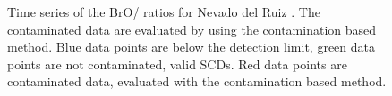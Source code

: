 \documentclass  [
  paper    = a4,
  BCOR     = 10mm,
  twoside,
  fontsize = 12pt,
  fleqn,
  toc      = bibnumbered,
  toc      = listofnumbered,
  numbers  = noendperiod,
  headings = normal,
  listof   = leveldown,
  version  = 3.03
]                                       {scrreprt}
\begin{document}
\begin{figure}
	\centering
	\caption{Time series of the BrO/ ratios for Nevado del Ruiz . The contaminated data are evaluated by using the contamination based method. Blue data points are below the detection limit, green data points are not contaminated, valid  SCDs. Red data points are contaminated data, evaluated with the contamination based method.}
	\label{fig:ndrso2novacsametime}
\end{figure}
\end{document}
